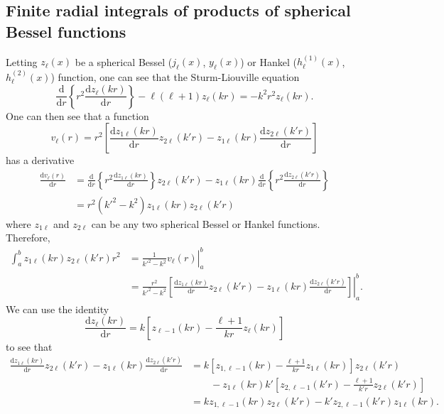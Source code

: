 \subsection{Finite radial integrals of products of spherical Bessel functions}\label{sec:finiteRadialIntegrals}

Letting $z_\ell(x)$ be a spherical Bessel ($j_\ell(x)$, $y_\ell(x)$) or Hankel ($h_\ell^{(1)}(x)$, $h_\ell^{(2)}(x)$) function, one can see that the Sturm-Liouville equation
\begin{equation}
\frac{\mathrm{d}}{\mathrm{d}r}\left\{r^2\frac{\mathrm{d}z_\ell(kr)}{\mathrm{d}r}\right\} - \ell(\ell + 1)z_\ell(kr) = -k^2r^2z_\ell(kr). 
\end{equation} 
One can then see that a function
\begin{equation}
v_\ell(r) = r^2\left[\frac{\mathrm{d}z_{1\ell}(kr)}{\mathrm{d}r}z_{2\ell}(k'r) - z_{1\ell}(kr)\frac{\mathrm{d}z_{2\ell}(k'r)}{\mathrm{d}r}\right]
\end{equation}
has a derivative
\begin{equation}
\begin{split}
\frac{\mathrm{d}v_\ell(r)}{\mathrm{d}r} &= \frac{\mathrm{d}}{\mathrm{d}r}\left\{r^2\frac{\mathrm{d}z_{1\ell}(kr)}{\mathrm{d}r}\right\}z_{2\ell}(k'r) - z_{1\ell}(kr)\frac{\mathrm{d}}{\mathrm{d}r}\left\{r^2\frac{\mathrm{d}z_{2\ell}(k'r)}{\mathrm{d}r}\right\}\\
&= r^2(k'^2 - k^2)z_{1\ell}(kr)z_{2\ell}(k'r)
\end{split}
\end{equation}
where $z_{1\ell}$ and $z_{2\ell}$ can be any two spherical Bessel or Hankel functions. Therefore,
\begin{equation}
\begin{split}
\int_a^bz_{1\ell}(kr)z_{2\ell}(k'r)r^2 &= \left.\frac{1}{k'^2 - k^2}v_\ell(r)\right|_a^b\\
&= \left.\frac{r^2}{k'^2 - k^2}\left[\frac{\mathrm{d}z_{1\ell}(kr)}{\mathrm{d}r}z_{2\ell}(k'r) - z_{1\ell}(kr)\frac{\mathrm{d}z_{2\ell}(k'r)}{\mathrm{d}r}\right]\right|_a^b.
\end{split}
\end{equation}
We can use the identity 
\begin{equation}
\frac{\mathrm{d}z_\ell(kr)}{\mathrm{d}r} = k\left[z_{\ell-1}(kr) - \frac{\ell + 1}{kr}z_\ell(kr)\right]
\end{equation}
to see that
\begin{equation}
\begin{split}
\frac{\mathrm{d}z_{1\ell}(kr)}{\mathrm{d}r}z_{2\ell}(k'r) - z_{1\ell}(kr)\frac{\mathrm{d}z_{2\ell}(k'r)}{\mathrm{d}r} &= k\left[z_{1,\ell-1}(kr) - \frac{\ell + 1}{kr}z_{1\ell}(kr)\right]z_{2\ell}(k'r)\\
&\qquad- z_{1\ell}(kr)k'\left[z_{2,\ell-1}(k'r) - \frac{\ell + 1}{k'r}z_{2\ell}(k'r)\right]\\[0.5em]
&= kz_{1,\ell-1}(kr)z_{2\ell}(k'r) - k'z_{2,\ell-1}(k'r)z_{1\ell}(kr).
\end{split}
\end{equation}
